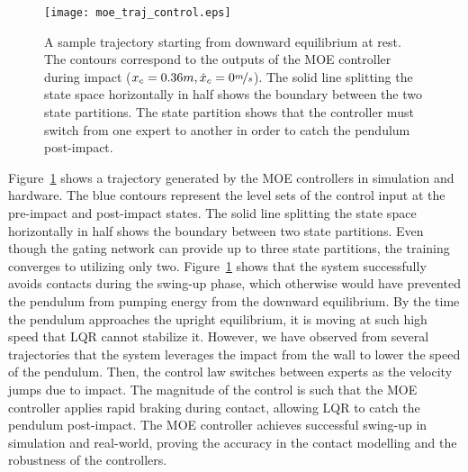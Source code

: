 \begin{figure}[tb]
    \centering
    \texttt{[image: moe\_traj\_control.eps]}
    \caption{A sample trajectory starting from downward equilibrium at rest.
    The contours correspond to the outputs of the MOE controller during impact
    ($x_c=0.36m, \dot{x}_c = 0\nicefrac{m}{s}$). The solid line
    splitting the state space horizontally in half shows the boundary between
    the two state partitions. The state partition shows that the controller must
    switch from one expert to another in order to catch the pendulum
    post-impact.}
    \label{fig:cartpole_trajectory}
\end{figure}

Figure~\ref{fig:cartpole_trajectory} shows a trajectory generated by the MOE
controllers in simulation and hardware.
%
The blue contours represent the level sets of the control input at the
pre-impact and post-impact states.
%
The solid line splitting the state space horizontally in half shows the boundary
between two state partitions.
%
Even though the gating network can provide up to three state partitions, the
training converges to utilizing only two.
%
Figure~\ref{fig:cartpole_trajectory} shows that the system successfully avoids
contacts during the swing-up phase, which otherwise would have prevented the
pendulum from pumping energy from the downward equilibrium.
%
By the time the pendulum approaches the upright equilibrium, it is moving at
such high speed that LQR cannot stabilize it.
%
However, we have observed from several trajectories that the system leverages
the impact from the wall to lower the speed of the pendulum.
%
Then, the control law switches between experts as the velocity jumps due to impact.
%
The magnitude of the control is such that the MOE controller applies rapid
braking during contact, allowing LQR to catch the pendulum post-impact.
%
The MOE controller achieves successful swing-up in simulation and real-world,
proving the accuracy in the contact modelling and the robustness of the
controllers.

